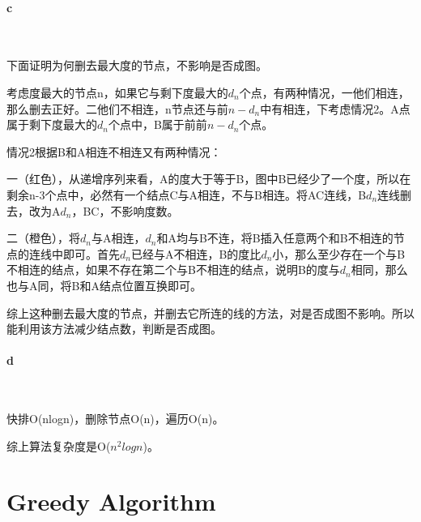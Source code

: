 \documentclass{article}
\begin{document}
		\paragraph{c}\
			
			下面证明为何删去最大度的节点，不影响是否成图。
			
			考虑度最大的节点n，如果它与剩下度最大的${d_n}$个点，有两种情况，一他们相连，那么删去正好。二他们不相连，n节点还与前$n-{d_n}$中有相连，下考虑情况2。A点属于剩下度最大的${d_n}$个点中，B属于前前$n-{d_n}$个点。
			
			
			情况2根据B和A相连不相连又有两种情况：
			
			一（红色），从递增序列来看，A的度大于等于B，图中B已经少了一个度，所以在剩余n-3个点中，必然有一个结点C与A相连，不与B相连。将AC连线，B${d_n}$连线删去，改为A${d_n}$，BC，不影响度数。
			
			二（橙色），将${d_n}$与A相连，${d_n}$和A均与B不连，将B插入任意两个和B不相连的节点的连线中即可。首先${d_n}$已经与A不相连，B的度比${d_n}$小，那么至少存在一个与B不相连的结点，如果不存在第二个与B不相连的结点，说明B的度与${d_n}$相同，那么也与A同，将B和A结点位置互换即可。
			
			综上这种删去最大度的节点，并删去它所连的线的方法，对是否成图不影响。所以能利用该方法减少结点数，判断是否成图。
			
		\paragraph{d}\
		
			快排O(nlogn)，删除节点O(n)，遍历O(n)。
			
			综上算法复杂度是O(${n^2}logn$)。

	\color{myblue} \section{Greedy Algorithm} \color{black}
\end{document}
